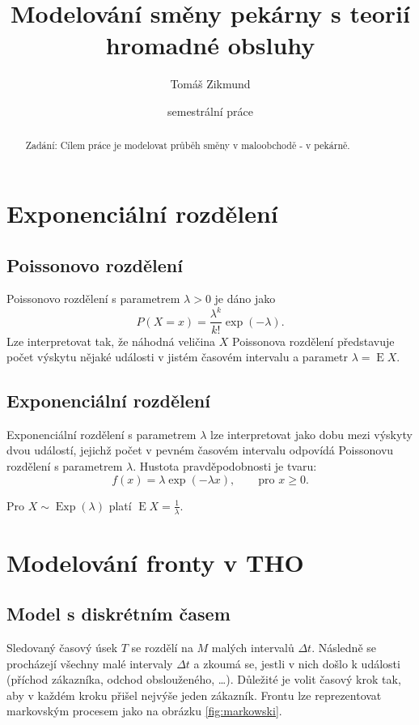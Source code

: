 \documentclass[a4paper,12pt]{article}
\title{Modelování směny pekárny s teorií hromadné obsluhy}
\date{semestrální práce}
\author{Tomáš Zikmund}
\DeclareMathOperator{\Exp}{Exp}
\DeclareMathOperator*{\E}{E}
\begin{document}
\maketitle
\begin{abstract}
Zadání: Cílem práce je modelovat průběh směny v maloobchodě - v pekárně. 
\end{abstract}

\section{Exponenciální rozdělení}
\subsection{Poissonovo rozdělení}
Poissonovo rozdělení s parametrem \(\lambda > 0\) je dáno jako 
\[P(X = x) = \frac{\lambda^k}{k!}\exp(-\lambda).\]
Lze interpretovat tak, že náhodná veličina \(X\) Poissonova rozdělení představuje 
počet výskytu nějaké události v jistém časovém intervalu a parametr \(\lambda = \E X\). 

\subsection{Exponenciální rozdělení}
Exponenciální rozdělení s parametrem \(\lambda\) lze interpretovat jako dobu mezi výskyty dvou událostí, 
jejichž počet v pevném časovém intervalu odpovídá Poissonovu rozdělení s parametrem \(\lambda\). 
Hustota pravděpodobnosti je tvaru:
\[f(x) = \lambda \exp(-\lambda x),\qquad\mbox{pro~}x\geq 0.\]

Pro \(X\sim \Exp(\lambda)\) platí \(\E X = \frac{1}{\lambda}\).

\section{Modelování fronty v THO}
\subsection{Model s diskrétním časem}
Sledovaný časový úsek \(T\) se rozdělí na \(M\) malých intervalů \(\Delta t\). 
Následně se procházejí všechny malé intervaly \(\Delta t\) a zkoumá se, jestli v nich došlo k události
(příchod zákazníka, odchod obslouženého, \ldots). Důležité je volit časový krok tak, aby v každém kroku přišel 
nejvýše jeden zákazník. Frontu lze reprezentovat markovským procesem jako na obrázku \ref{fig:markowski}. 
\end{document}
